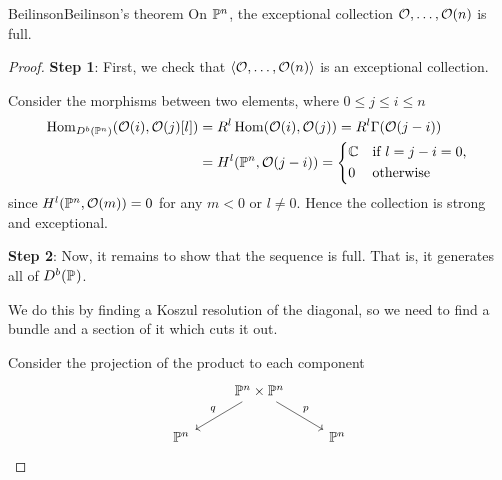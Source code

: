 \begin{theorem}{Beilinson}{Beilinson's theorem}
    On $\P^n$, the exceptional collection $\O,\dots,\O(n)$ is full.
\end{theorem}

\begin{proof}
    \textbf{Step 1}:
    First, we check that $\langle\O,\dots,\O(n)\rangle$ is an exceptional collection.

    Consider the morphisms between two elements, where $0\leq j\leq i \leq n$
    \begin{align*}
        \Hom_{D^b(\P^n)}(\O(i),\O(j)[l])
            &= R^l\Hom(\O(i),\O(j))
            = R^l\Gamma(\O(j-i)) \\
            &= H^l(\P^n,\O(j-i))
            = \begin{cases*}
                \C & if $l=j-i=0$, \\
                0 & otherwise
            \end{cases*}
    \end{align*}
    since $H^{l}(\P^n,\O(m))=0$ for any $m<0$ or $l \neq 0$. Hence the collection is strong and exceptional.

    \textbf{Step 2}:
    Now, it remains to show that the sequence is full. That is, it generates all of $D^b(\P^{})$.

    We do this by finding a Koszul resolution of the diagonal, so we need to find a bundle and a section of it which cuts it out.

    Consider the projection of the product to each component
    \begin{equation*}
        \begin{tikzcd}
            & \P^n\times\P^n \ar[dl,"q"'] \ar[dr,"p"] \\
            \P^n & & \P^n
        \end{tikzcd}
    \end{equation*}


\end{proof}
